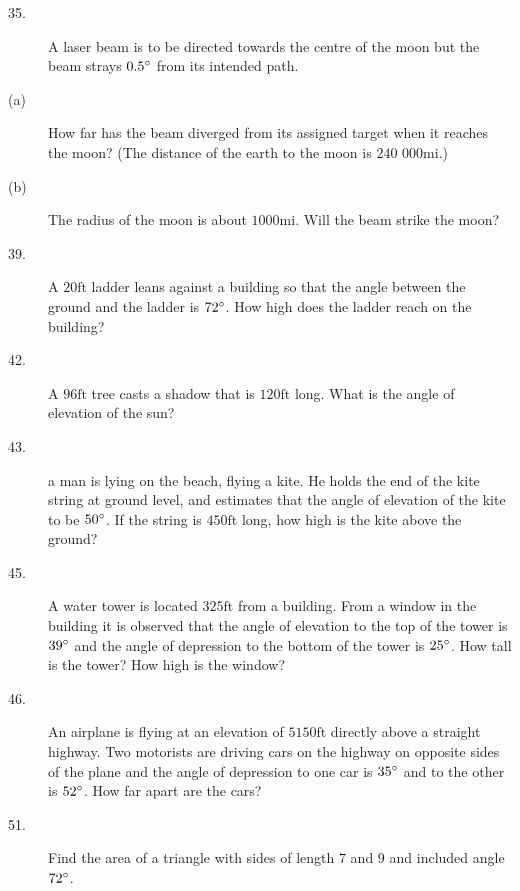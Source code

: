 \begin{description}
\begin{description}
	\item [35.]
	A laser beam is to be directed towards the centre of the moon but the beam strays $0.5 \mbox{{\ensuremath{{}^\circ}}}$ from its intended path. 
	
	\item [(a)]
	How far has the beam diverged from its assigned target when it reaches the moon? (The distance of the earth
	to the moon is $240$ $000 \mbox{mi}\text{.}$) 
	
	\item [(b)] The radius
	of the moon is about $1000 \mbox{mi}$. Will the beam strike the moon? 
	
	\item [39.]
	A $20 \mbox{ft}$ ladder leans against a building so that the angle between the ground and the ladder is $72 \mbox{{\ensuremath{{}^\circ}}}$. How high does the ladder reach on the building?
	
	
	\item [42.] A $96 \mbox{ft}$ tree casts a shadow that is $120 \mbox{ft}$ long. What is the angle of elevation of the sun?
	
	
	\item [43.] a man is lying on the beach, flying a kite. He
	holds the end of the kite string at ground level, and estimates that the angle of elevation of the kite to be $50 \mbox{{\ensuremath{{}^\circ}}}$. If the string is $450 \mbox{ft}$ long, how high is the kite above the ground? 
	
	\item [45.]
	A water tower is located $325 \mbox{ft}$ from a building. From a window in the building
	it is observed that the angle of elevation to the top of the tower is $39 \mbox{{\ensuremath{{}^\circ}}}$ and the angle of depression to the bottom of the tower is $25 \mbox{{\ensuremath{{}^\circ}}}$. How tall is the tower? How
	high is the window? 
	
	\item [46.] An airplane is flying at an
	elevation of $5150 \mbox{ft}$ directly above a straight highway. Two motorists
	are driving cars on the highway on opposite sides of the plane and the angle of depression to one car is $35 \mbox{{\ensuremath{{}^\circ}}}$ and to the other is $52 \mbox{{\ensuremath{{}^\circ}}}$. How far apart are the cars? 


\item [51.] Find the area of a triangle
with sides of length $7$ and $9$ and included angle $72 \mbox{{\ensuremath{{}^\circ}}}$. 


\end{description}
\end{description}
